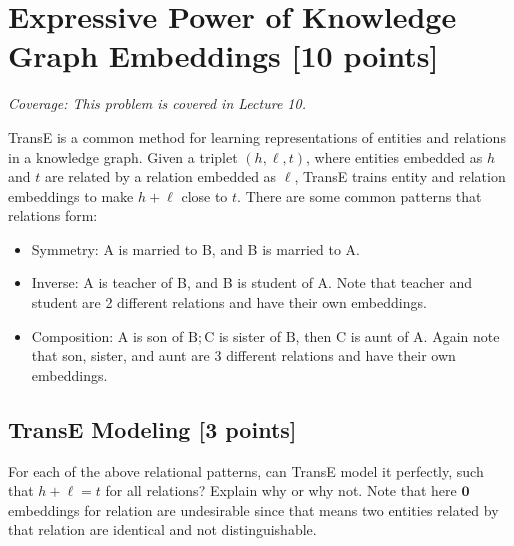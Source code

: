 \section{Expressive Power of Knowledge Graph Embeddings [10 points]}
\noindent\textit{Coverage: This problem is covered in Lecture 10.}

TransE is a common method for learning representations of entities and relations in a knowledge graph. Given a triplet $(h, \ell, t)$, where entities embedded as $h$ and $t$ are related by a relation embedded as $\ell$, TransE trains entity and relation embeddings to make $h+\ell$ close to $t$. There are some common patterns that relations form:
\begin{itemize}
    \item Symmetry: A is married to B, and B is married to A.
    \item Inverse: A is teacher of B, and B is student of A. Note that teacher and student are 2 different relations and have their own embeddings.
    \item Composition: $\mathrm{A}$ is son of $\mathrm{B} ; \mathrm{C}$ is sister of $\mathrm{B}$, then $\mathrm{C}$ is aunt of $\mathrm{A}$. Again note that son, sister, and aunt are 3 different relations and have their own embeddings.
\end{itemize}
\subsection{TransE Modeling [3 points]}
For each of the above relational patterns, can TransE model it perfectly, such that $h+\ell=t$ for all relations? Explain why or why not. Note that here $\mathbf{0}$ embeddings for relation are undesirable since that means two entities related by that relation are identical and not distinguishable.


